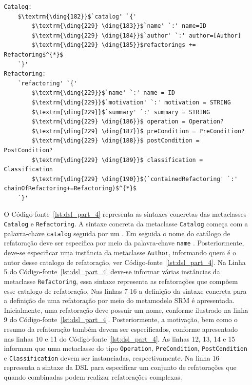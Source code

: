 \begin{lstlisting}[language=Xtext, frame=single, basicstyle=\scriptsize, mathescape=true, label={lst:dsl_part_4}, caption={Gramática da DSL - parte 4}]
Catalog:
	$\textrm{\ding{182}}$`catalog' `{' 
		$\textrm{\ding{229} \ding{183}}$`name' `:' name=ID
		$\textrm{\ding{229} \ding{184}}$`author' `:' author=[Author]
		$\textrm{\ding{229} \ding{185}}$refactorings += Refactoring$^{*}$
	`}'
Refactoring:
	`refactoring' `{' 
		$\textrm{\ding{229}}$`name' `:' name = ID
		$\textrm{\ding{229}}$`motivation' `:' motivation = STRING
		$\textrm{\ding{229}}$`summary' `:' summary = STRING
		$\textrm{\ding{229} \ding{186}}$ operation = Operation?
		$\textrm{\ding{229} \ding{187}}$ preCondition = PreCondition?
		$\textrm{\ding{229} \ding{188}}$ postCondition = PostCondition?
		$\textrm{\ding{229} \ding{189}}$ classification = Classification
		$\textrm{\ding{229} \ding{190}}$(`containedRefactoring' `:' chainOfRefactoring+=Refactoring)$^{*}$
	`}'
\end{lstlisting}

O Código-fonte~\ref{lst:dsl_part_4} representa as sintaxes concretas das metaclasses \texttt{Catalog} e \texttt{Refactoring}. A sintaxe concreta da metaclasse \texttt{Catalog} começa com a palavra-chave \texttt{catalog} seguida por um \aspas{\{}. Em seguida o nome do catálogo de refatoração deve ser especifica por meio da palavra-chave \texttt{name} . Posteriormente, deve-se especificar uma instância da metaclasse \texttt{Author}, informando quem é o autor desse catalogo de refatoração, ver Código-fonte~\ref{lst:dsl_part_4}. Na Linha 5 do Código-fonte~\ref{lst:dsl_part_4} deve-se informar várias instâncias da metaclasse \texttt{Refactoring}, essa sintaxe representa as refatorações que compõem esse catalogo de refatoração. Nas linhas 7-16 a definição da sintaxe concreta para a definição de uma refatoração por meio do metamodelo SRM é apresentada. Inicialmente, uma refatoração deve possuir um nome, conforme ilustrado na linha 9 do Código-fonte~\ref{lst:dsl_part_4}. Posteriormente, a motivação, bem como o resumo da refatoração também devem ser especificados, conforme apresentado nas linhas 10 e 11 do Código-fonte~\ref{lst:dsl_part_4}. As linhas 12, 13, 14 e 15 informam que uma metaclasse do tipo \texttt{Operation}, \texttt{PreCondition}, \texttt{PostCondition} e \texttt{Classification}  devem ser instanciadas, respectivamente. Na linha 16 representa a sintaxe da DSL para especificar um conjunto de refatorações que quando combinadas podem realizar refatorações complexas.

